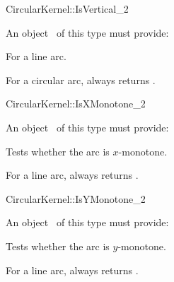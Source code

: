 









\begin{ccRefFunctionObjectConcept}{CircularKernel::IsVertical_2}


\ccRefines


An object \ccVar\ of this type must provide:

{For a line arc.}

{For a circular arc,  always returns .}

\end{ccRefFunctionObjectConcept}
\begin{ccRefFunctionObjectConcept}{CircularKernel::IsXMonotone_2}


An object \ccVar\ of this type must provide:

{Tests whether the arc is $x$-monotone.}

{For a line arc, always returns .}

\end{ccRefFunctionObjectConcept}
\begin{ccRefFunctionObjectConcept}{CircularKernel::IsYMonotone_2}


An object \ccVar\ of this type must provide:

{Tests whether the arc is $y$-monotone.}

{For a line arc, always returns .}

\end{ccRefFunctionObjectConcept}
